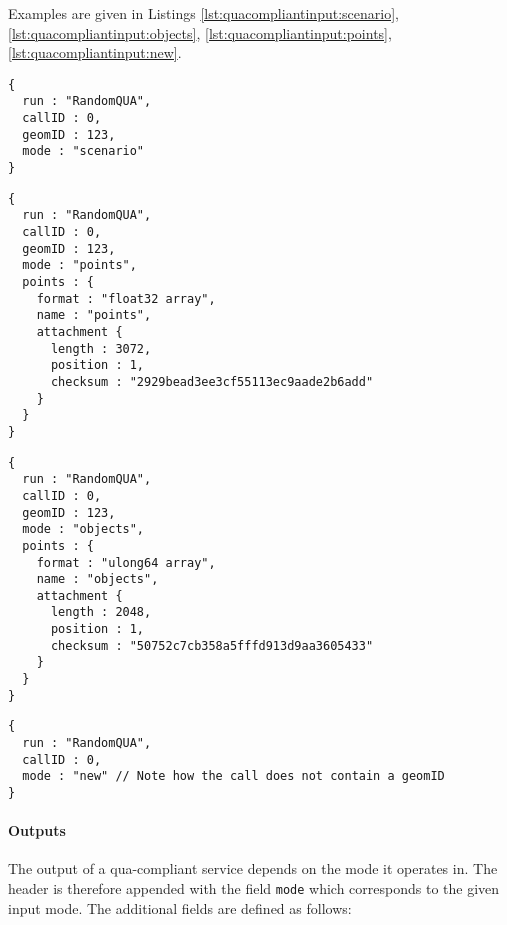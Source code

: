 Examples are given in Listings \ref{lst:quacompliantinput:scenario}, \ref{lst:quacompliantinput:objects}, \ref{lst:quacompliantinput:points}, \ref{lst:quacompliantinput:new}.

\begin{lstlisting}[caption={A qua-compliant service run request for mode \texttt{scenario}}, label={lst:quacompliantinput:scenario}]
{
  run : "RandomQUA",
  callID : 0,
  geomID : 123,
  mode : "scenario"
}
\end{lstlisting}

\begin{lstlisting}[caption={A qua-compliant service run request for mode \texttt{points}}, label={lst:quacompliantinput:points}]
{
  run : "RandomQUA",
  callID : 0,
  geomID : 123,
  mode : "points",
  points : {
    format : "float32 array",
    name : "points",
    attachment {
      length : 3072,
      position : 1,
      checksum : "2929bead3ee3cf55113ec9aade2b6add"
    }
  }
}
\end{lstlisting}

\begin{lstlisting}[caption={A qua-compliant service run request for mode \texttt{objects}}, label={lst:quacompliantinput:objects}]
{
  run : "RandomQUA",
  callID : 0,
  geomID : 123,
  mode : "objects",
  points : {
    format : "ulong64 array",
    name : "objects",
    attachment {
      length : 2048,
      position : 1,
      checksum : "50752c7cb358a5fffd913d9aa3605433"
    }
  }
}
\end{lstlisting}


\begin{lstlisting}[caption={A qua-compliant service run request for mode \texttt{new}}, label={lst:quacompliantinput:new}]
{
  run : "RandomQUA",
  callID : 0,
  mode : "new" // Note how the call does not contain a geomID
}
\end{lstlisting}

\paragraph{Outputs}
The output of a qua-compliant service depends on the mode it operates in. The header is therefore appended with the field \texttt{mode} which corresponds to the given input mode. The additional fields are defined as follows:

